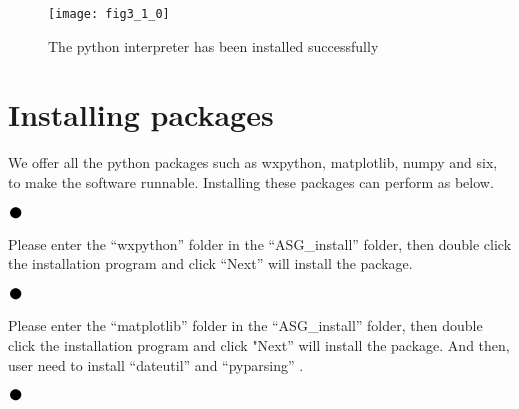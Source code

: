 \begin{figure}[ht]
\centering
\texttt{[image: fig3\_1\_0]}
\caption{The python interpreter has been installed successfully}
\end{figure}

\newpage
\section{\heiti Installing packages}
We offer all the python packages such as wxpython, matplotlib, numpy and six, to make the software runnable. Installing these packages can perform as below.
\vspace{0.3cm}

\noindent$\vcenter{\hbox{\huge$\bullet$}}$\quad\fontsize{12pt}{\baselineskip}\textbf{}

Please enter the “wxpython” folder in the “ASG\_install” folder, then double click the installation program and click “Next” will install the package. 
\vspace{0.3cm}

\noindent$\vcenter{\hbox{\huge$\bullet$}}$\quad\fontsize{12pt}{\baselineskip}\textbf{ }

Please enter the “matplotlib” folder in the “ASG\_install” folder, then double click the installation program and click "Next” will install the package. And then, user need to install “dateutil” and “pyparsing” .
\vspace{0.3cm}

\noindent$\vcenter{\hbox{\huge$\bullet$}}$\quad\fontsize{12pt}{\baselineskip}\textbf{ }

